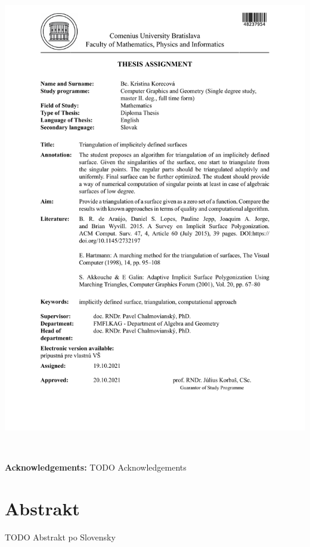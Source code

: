\documentclass[12pt, twoside]{book}
\begin{document}
\hspace{-2cm}\includegraphics[page=2,width=1.1\textwidth]{images/zadanie-en}


\frontmatter

\setcounter{page}{3}
\newpage 
~

\vfill
{\bf Acknowledgements:} TODO Acknowledgements


\newpage 
\section*{Abstrakt}

TODO Abstrakt po Slovensky
\end{document}
